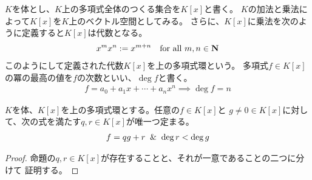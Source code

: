 {	$K$を体とし、$K$上の多項式全体のつくる集合を$K[x]$と書く。
	$K$の加法と乗法によって$K[x]$を$K$上のベクトル空間としてみる。
	さらに、$K[x]$に乗法を次のように定義すると$K[x]$は代数となる。
	\begin{equation*}\begin{split}
		x^mx^n := x^{m+n} \quad\text{for all } m,n\in\mathbf{N}
	\end{split}\end{equation*}
	このようにして定義された代数$K[x]$を上の多項式環という。
	多項式$f\in K[x]$の冪の最高の値を$f$の次数といい、$\deg f$と書く。
	\begin{equation*}\begin{split}
		f = a_0 + a_1x + \cdots + a_nx^n \implies \deg f = n
	\end{split}\end{equation*}

	\begin{proposition}[多項式の剰余]\label{prop:多項式の剰余} %
		$K$を体、$K[x]$を上の多項式環とする。任意の$f\in K[x]$と
		$g\neq0\in K[x]$に対して、次の式を満たす$q,r\in K[x]$が唯一つ定まる。
		\begin{equation*}\begin{split}
			f = qg + r \And \deg r < \deg g
		\end{split}\end{equation*}
	\end{proposition} %
	\begin{proof} %
		命題の$q,r\in K[x]$が存在することと、それが一意であることの二つに分けて
		証明する。


\end{proof}}
